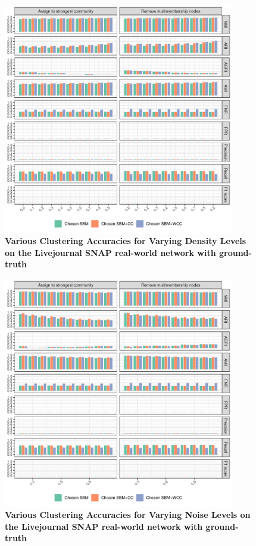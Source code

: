 \documentclass[aps,pre,superscriptaddress]{article}
\begin{document}
\begin{figure}[!htpb]
	\centering
	\includegraphics[width=0.9\textwidth]{figures/density_livejournal_accuracy.pdf}
	\caption[]{\textbf{Various Clustering Accuracies for Varying Density Levels on the Livejournal SNAP real-world network with ground-truth}}
	\label{fig:density-livejournal-accuracy}
\end{figure}

\begin{figure}[!htpb]
	\centering
	\includegraphics[width=0.9\textwidth]{figures/noise_livejournal_accuracy.pdf}
	\caption[]{\textbf{Various Clustering Accuracies for Varying Noise Levels on the Livejournal SNAP real-world network with ground-truth}}
	\label{fig:noise-livejournal-accuracy}
\end{figure}
\end{document}
